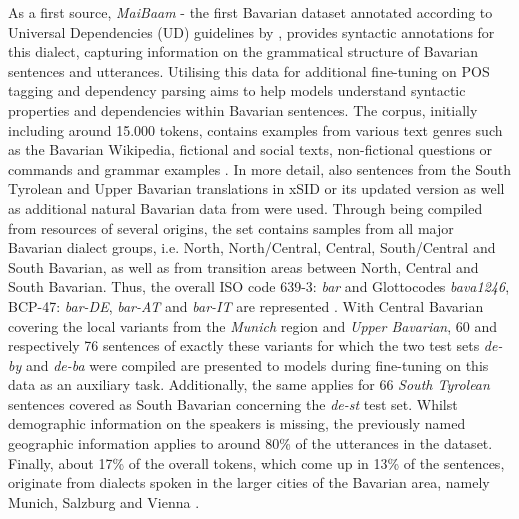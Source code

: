 \documentclass[11pt,a4paper,twoside,openright]{scrbook}
\begin{document}
As a first source, \textit{MaiBaam} - the first Bavarian dataset annotated according to Universal Dependencies (UD) guidelines by \citet{blaschke-etal-2024-maibaam-multi}, provides syntactic annotations for this dialect, capturing information on the grammatical structure of Bavarian sentences and utterances. Utilising this data for additional fine-tuning on POS tagging and dependency parsing aims to help models understand syntactic properties and dependencies within Bavarian sentences. The corpus, initially including around 15.000 tokens, contains examples from various text genres such as the Bavarian Wikipedia, fictional and social texts, non-fictional questions or commands and grammar examples \citep{blaschke-etal-2024-maibaam-multi}. In more detail, also sentences from the South Tyrolean and Upper Bavarian translations in xSID or its updated version \citep{van-der-goot-etal-2021-masked, winkler-etal-2024-slot-intent} as well as additional natural Bavarian data from \citet{winkler-etal-2024-slot-intent} were used. Through being compiled from resources of several origins, the set contains samples from all major Bavarian dialect groups, i.e. North, North/Central, Central, South/Central and South Bavarian, as well as from transition areas between North, Central and South Bavarian. Thus, the overall ISO code 639-3: \textit{bar} and Glottocodes \textit{bava1246}, BCP-47: \textit{bar-DE},\textit{ bar-AT} and \textit{bar-IT} are represented \citep{blaschke-etal-2024-maibaam-multi}. With Central Bavarian covering the local variants from the \textit{Munich} region and \textit{Upper Bavarian}, 60 and respectively 76 sentences of exactly these variants for which the two test sets \textit{de-by} and \textit{de-ba} were compiled are presented to models during fine-tuning on this data as an auxiliary task. Additionally, the same applies for 66 \textit{South Tyrolean} sentences covered as South Bavarian concerning the \textit{de-st} test set. Whilst demographic information on the speakers is missing, the previously named geographic information applies to around 80\% of the utterances in the dataset. Finally, about 17\% of the overall tokens, which come up in 13\% of the sentences, originate from dialects spoken in the larger cities of the Bavarian area, namely Munich, Salzburg and Vienna \citep{blaschke-etal-2024-maibaam-multi}.
\end{document}
